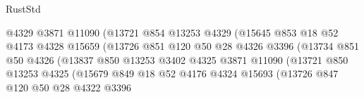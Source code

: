 \begin{lexlean}{RustStd}
\begin{coremodule}
                                      @4329
                                      @3871
                                      @11090
                                      (@13721
                                        @854
                                        @13253
                                        @4329
                                        (@15645
                                          @853
                                          @18
                                          @52
                                          @4173
                                          @4328
                                          @15659
                                          (@13726
                                            @851
                                            @120
                                            @50
                                            @28
                                            @4326
                                            @3396
                                            (@13734
                                              @851
                                              @50
                                              @4326
                                              (@13837
                                                @850
                                                @13253
                                                @3402
                                                @4325
                                                @3871
                                                @11090
                                                (@13721
                                                  @850
                                                  @13253
                                                  @4325
                                                  (@15679
                                                    @849
                                                    @18
                                                    @52
                                                    @4176
                                                    @4324
                                                    @15693
                                                    (@13726
                                                      @847
                                                      @120
                                                      @50
                                                      @28
                                                      @4322
                                                      @3396

\end{coremodule}
\end{lexlean}
